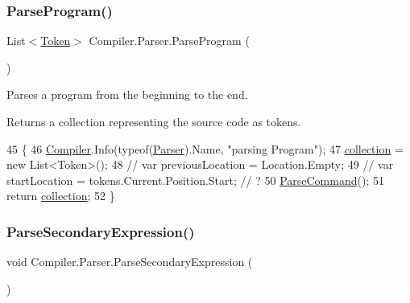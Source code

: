 \subsubsection{\texorpdfstring{Parse\+Program()}{ParseProgram()}}
{\footnotesize\ttfamily List$<$\mbox{\hyperlink{class_compiler_1_1_token}{Token}}$>$ Compiler.\+Parser.\+Parse\+Program (\begin{DoxyParamCaption}{ }\end{DoxyParamCaption})}

Parses a program from the beginning to the end. \begin{DoxyReturn}{Returns}
a collection representing the source code as tokens. 
\end{DoxyReturn}

\begin{DoxyCode}
45                                                       \{
46                         \mbox{\hyperlink{namespace_compiler}{Compiler}}.Info(typeof(\mbox{\hyperlink{class_compiler_1_1_parser_a450e11452db3f91ff866fc1e36ebc79d}{Parser}}).Name, \textcolor{stringliteral}{"parsing Program"});
47                         \mbox{\hyperlink{class_compiler_1_1_parser_ac30c9381b172d482cc5bb1356c5a901b}{collection}} = \textcolor{keyword}{new} List<Token>();
48                         \textcolor{comment}{// var previousLocation = Location.Empty;}
49                         \textcolor{comment}{// var startLocation = tokens.Current.Position.Start; // ?}
50                         \mbox{\hyperlink{class_compiler_1_1_parser_a7ab30d3d783ccf064784df2df654ea76}{ParseCommand}}();
51                         \textcolor{keywordflow}{return} \mbox{\hyperlink{class_compiler_1_1_parser_ac30c9381b172d482cc5bb1356c5a901b}{collection}};
52                     \}
\end{DoxyCode}
\mbox{\label{class_compiler_1_1_parser_a2c35615302bb055e4e720b94e5020a59}} 
\subsubsection{\texorpdfstring{Parse\+Secondary\+Expression()}{ParseSecondaryExpression()}}
{\footnotesize\ttfamily void Compiler.\+Parser.\+Parse\+Secondary\+Expression (\begin{DoxyParamCaption}{ }\end{DoxyParamCaption})\hspace{0.3cm}{\ttfamily [protected]}}

